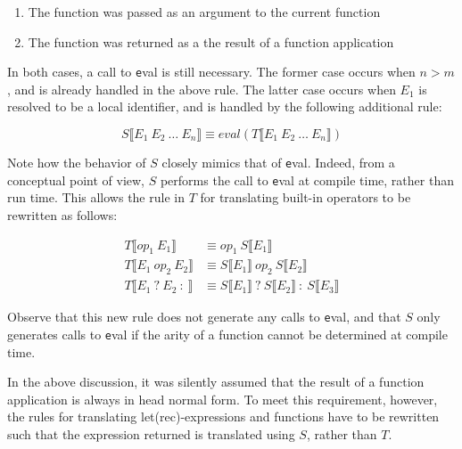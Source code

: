\begin{enumerate}
\item The function was passed as an argument to the current function
\item The function was returned as a the result of a function application
\end{enumerate}

In both cases, a call to {\texttt eval} is still necessary. The former case
occurs when $n > m$, and is already handled in the above rule. The latter case
occurs when $E_1$ is resolved to be a local identifier, and is handled by the
following additional rule:

\[ S \llbracket E_1 \: E_2 \: \ldots \: E_n \rrbracket \equiv
   eval(T \llbracket E_1 \: E_2 \: \ldots \: E_n \rrbracket) \]

Note how the behavior of $S$ closely mimics that of {\texttt eval}. Indeed,
from a conceptual point of view, $S$ performs the call to {\texttt eval} at
compile time, rather than run time. This allows the rule in $T$ for translating
built-in operators to be rewritten as follows:

\begin{align*}
T \llbracket op_1 \: E_1 \rrbracket &
        \equiv op_1 \: S \llbracket E_1 \rrbracket \\
T \llbracket E_1 \: op_2 \: E_2 \rrbracket &
        \equiv S \llbracket E_1 \rrbracket \: op_2 \:
               S \llbracket E_2 \rrbracket \\
T \llbracket E_1 \: ? \: E_2 \: : \: \rrbracket &
        \equiv S \llbracket E_1 \rrbracket \: ? \:
               S \llbracket E_2 \rrbracket \: : \:
               S \llbracket E_3 \rrbracket 
\end{align*}

Observe that this new rule does not generate any calls to {\texttt eval}, and
that $S$ only generates calls to {\texttt eval} if the arity of a function
cannot be determined at compile time.

In the above discussion, it was silently assumed that the result of a function
application is always in head normal form. To meet this requirement, however,
the rules for translating let(rec)-expressions and functions have to be
rewritten such that the expression returned is translated using $S$, rather than
$T$.




